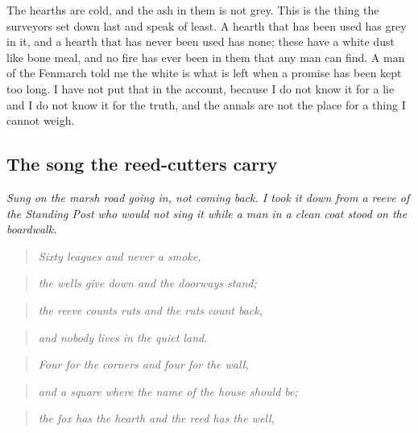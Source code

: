 \documentclass{design/chronicle}
\begin{document}
The hearths are cold, and the ash in them is not grey. This is the thing the surveyors set down last and speak of least. A hearth that has been used has grey in it, and a hearth that has never been used has none; these have a white dust like bone meal, and no fire has ever been in them that any man can find. A man of the Fenmarch told me the white is what is left when a promise has been kept too long. I have not put that in the account, because I do not know it for a lie and I do not know it for the truth, and the annals are not the place for a thing I cannot weigh.

\subsection*{The song the reed-cutters carry}

\emph{Sung on the marsh road going in, not coming back. I took it down from a reeve of the Standing Post who would not sing it while a man in a clean coat stood on the boardwalk.}

\begin{quote}\itshape Sixty leagues and never a smoke,\end{quote}

\begin{quote}\itshape the wells give down and the doorways stand;\end{quote}

\begin{quote}\itshape the reeve counts ruts and the ruts count back,\end{quote}

\begin{quote}\itshape and nobody lives in the quiet land.\end{quote}

\begin{quote}\itshape \end{quote}

\begin{quote}\itshape Four for the corners and four for the wall,\end{quote}

\begin{quote}\itshape and a square where the name of the house should be;\end{quote}

\begin{quote}\itshape the fox has the hearth and the reed has the well,\end{quote}
\end{document}
